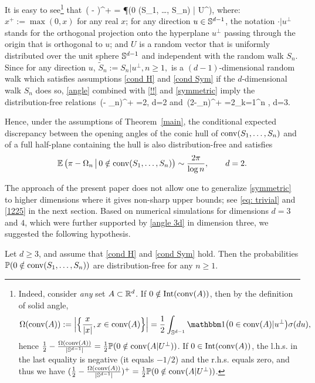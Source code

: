 \documentclass[12pt, reqno]{amsart}
\begin{document}
It is easy to see\footnote{Indeed, consider {\it any} set $A \subset \R^d$. If $0 \notin \Intr(\conv(A))$, then by the definition of solid angle, $$\Omega(\conv(A)) := \Bigl| \Bigl \{ \frac{x}{|x|}, x \in \conv(A) \Bigr\} \Bigr| = \frac{1}{2} \int_{\S^{d-1}} \I \bigl( 0 \in \conv(A) | u^\bot \bigr) \sigma(d u),$$ hence $\frac12 - \frac{\Omega(\conv(A))}{|\S^{d-1}|}  = \frac12 \P(0 \notin \conv(A | U^\bot))$. If $0 \in \Intr(\conv(A))$, the l.h.s. in the last equality is negative (it equals $-1/2$) and the r.h.s. equals zero, and thus we have $(\frac12 - \frac{\Omega(\conv(A))}{|\S^{d-1}|} )^+ = \frac12 \P(0 \notin \conv(A | U^\bot))$.} that
\be \label{angle}
\E\,\Bigl( -  \Bigr)^+ =  \P\bigl(0 \notin \conv(S_1, \dots, S_n) | U^\bot \bigr),
\ee
where: $x^+:=\max(0, x)$ for any real $x$; for any  direction $u \in \S^{d-1}$, the notation $\cdot | u^\bot$ stands for the orthogonal projection onto the hyperplane $u^\bot$ passing through the origin that is orthogonal to $u$; and $U$ is a random vector that is uniformly distributed over the unit sphere $\S^{d-1}$ and independent with the random walk $S_n$. Since for any direction $u$, $\tilde{S}_n:=S_n | u^\bot, n \ge 1,$ is a $(d-1)$-dimensional random walk which satisfies assumptions \eqref{cond H} and \eqref{cond Sym} if the $d$-dimensional walk $S_n$ does so, \eqref{angle} combined with \eqref{!!}  and \eqref{symmetric} imply the distribution-free relations
\be \label{angle 2d}
\E\,(\pi - \Omega_n)^+ =2\pi {}, \qquad d=2
\ee
and
\be \label{angle 3d} 
\E\,(2\pi -\Omega_n)^+ =2\pi\sum_{k=1}^n , \qquad d=3.
\ee

Hence, under the assumptions of Theorem~\ref{main}, the conditional expected discrepancy between the opening angles of the conic hull of $\conv(S_1, \dots, S_n)$ and of a full half-plane containing the hull is also distribution-free and satisfies
$$\E\,\bigl(\pi - \Omega_n \, \bigl | \bigr. \, 0 \notin \conv(S_1, \dots, S_n) \bigr) \sim \frac{ 2\pi}{\log n}, \qquad d=2.$$ 

\medskip

The approach of the present paper does not allow one to generalize \eqref{symmetric} to higher dimensions where it gives non-sharp upper bounds; see \eqref{eq: trivial} and  \eqref{1225} in the next section. Based on numerical simulations for dimensions $d=3$ and $4$, which were further supported by \eqref{angle 3d} in dimension three, we suggested the following hypothesis.
\begin{conj}
Let $d \ge 3$, and assume that \eqref{cond H} and \eqref{cond Sym} hold. Then the probabilities $\P(0 \notin \conv(S_1,  \dots, S_n))$ are distribution-free for any $n \ge 1$.
\end{conj}
\end{document}
